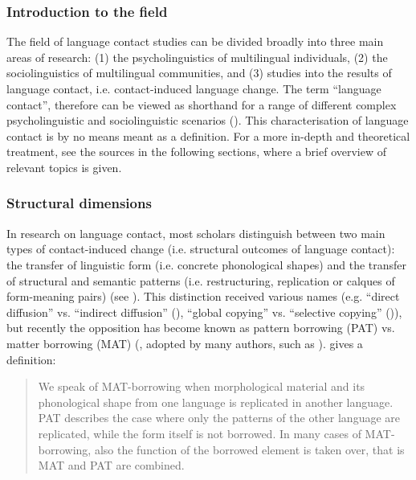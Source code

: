 \subsubsection{Introduction to the field}

The field of language contact studies can be divided broadly into three main areas of research: (1) the psycholinguistics of multilingual individuals, (2) the sociolinguistics of multilingual communities, and (3) studies into the results of language contact, i.e. contact\hyp induced language change. The term “language contact”, therefore can be viewed as shorthand for a range of different complex psycholinguistic and sociolinguistic scenarios (\cites[25]{pakendorf2007sakha}). This characterisation of language contact is by no means meant as a definition. For a more in-depth and theoretical treatment, see the sources in the following sections, where a brief overview of relevant topics is given.


\subsubsection{Structural dimensions}

In research on language contact, most scholars distinguish between two main types of contact-induced change (i.e. structural outcomes of language contact): the transfer of linguistic form (i.e. concrete phonological shapes) and the transfer of structural and semantic patterns (i.e. restructuring, replication or calques of form-meaning pairs) (see \cite{weinreich1953contact,haugen1953bilingual,heath1984contactchange,matrassakel2007pattern}). This distinction received various names (e.g. ``direct diffusion'' vs. ``indirect diffusion'' (\cite[119]{heath1978arnhemland}), ``global copying'' vs. ``selective copying'' (\cite{johanson1999codecopying,johanson2002framework})), but recently the opposition has become known as pattern borrowing (PAT) vs. matter borrowing (MAT) (\cite{matrassakel2007pattern}, adopted by many authors, such as \cite{gardani2020matpatmorph,arkadiev2018preverbs,wiemerwaelchli2023intro}). \textcite{sakel2007matpat} gives a definition: 

\begin{quote}
	We speak of MAT-borrowing when morphological material and its phonological shape from one language is replicated in another language. PAT describes the case where only the patterns of the other language are replicated, while the form itself is not borrowed. In many cases of MAT-borrowing, also the function of the borrowed element is taken over, that is MAT and PAT are combined.
\end{quote}

